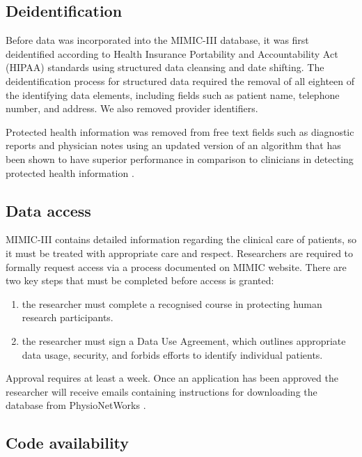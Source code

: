 \documentclass[english]{article}
\begin{document}
\subsection*{Deidentification}

Before data was incorporated into the MIMIC-III database, it was first deidentified according to Health Insurance Portability and Accountability Act (HIPAA) standards using structured data cleansing and date shifting. The deidentification process for structured data required the removal of all eighteen of the identifying data elements, including fields such as patient name, telephone number, and address. We also removed provider identifiers.

Protected health information was removed from free text fields such as diagnostic reports and physician notes using an updated version of an algorithm that has been shown to have superior performance in comparison to clinicians in detecting protected health information \cite{cite5}.

\subsection*{Data access}

MIMIC-III contains detailed information regarding the clinical care of patients, so it must be treated with appropriate care and respect. Researchers are required to formally request access via a process documented on MIMIC website. There are two key steps that must be completed before access is granted:

\begin{enumerate}
  \item the researcher must complete a recognised course in protecting human research participants.
  \item the researcher must sign a Data Use Agreement, which outlines appropriate data usage, security, and forbids efforts to identify individual patients.
\end{enumerate}

Approval requires at least a week. Once an application has been approved the researcher will receive emails containing instructions for downloading the database from PhysioNetWorks \cite{cite6}. 

\subsection*{Code availability}

\end{document}
